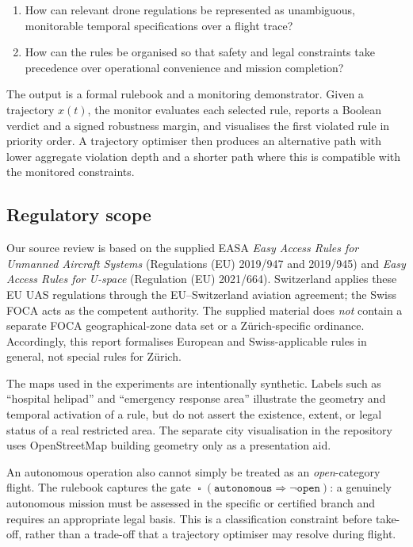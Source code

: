 \documentclass[11pt,a4paper]{article}
\newcommand{\always}{\mathop{\square}}
\begin{document}
\begin{enumerate}[leftmargin=1.4em]
    \item How can relevant drone regulations be represented as unambiguous, monitorable temporal specifications over a flight trace?
    \item How can the rules be organised so that safety and legal constraints take precedence over operational convenience and mission completion?
\end{enumerate}

The output is a formal rulebook and a monitoring demonstrator. Given a trajectory $x(t)$, the monitor evaluates each selected rule, reports a Boolean verdict and a signed robustness margin, and visualises the first violated rule in priority order. A trajectory optimiser then produces an alternative path with lower aggregate violation depth and a shorter path where this is compatible with the monitored constraints.

\subsection{Regulatory scope}

Our source review is based on the supplied EASA \emph{Easy Access Rules for Unmanned Aircraft Systems} (Regulations (EU) 2019/947 and 2019/945) and \emph{Easy Access Rules for U-space} (Regulation (EU) 2021/664). Switzerland applies these EU UAS regulations through the EU--Switzerland aviation agreement; the Swiss FOCA acts as the competent authority. The supplied material does \emph{not} contain a separate FOCA geographical-zone data set or a Z\"urich-specific ordinance. Accordingly, this report formalises European and Swiss-applicable rules in general, not special rules for Z\"urich.

The maps used in the experiments are intentionally synthetic. Labels such as ``hospital helipad'' and ``emergency response area'' illustrate the geometry and temporal activation of a rule, but do not assert the existence, extent, or legal status of a real restricted area. The separate city visualisation in the repository uses OpenStreetMap building geometry only as a presentation aid.

An autonomous operation also cannot simply be treated as an \emph{open}-category flight. The rulebook captures the gate $\always(\texttt{autonomous}\Rightarrow \neg\texttt{open})$: a genuinely autonomous mission must be assessed in the specific or certified branch and requires an appropriate legal basis. This is a classification constraint before take-off, rather than a trade-off that a trajectory optimiser may resolve during flight.
\end{document}
